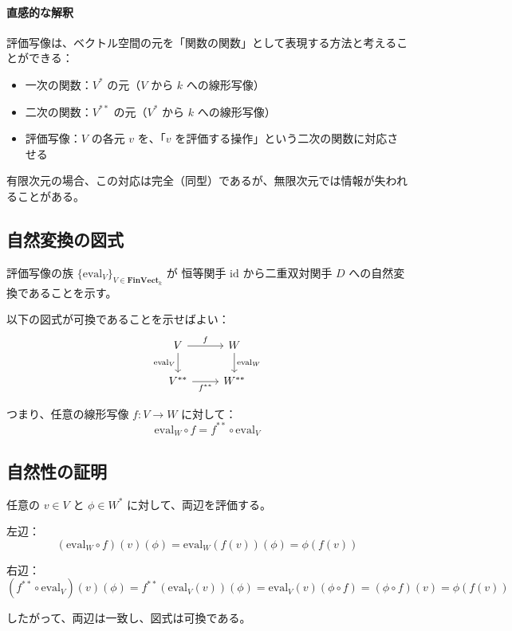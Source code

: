 \documentclass[uplatex,a4j,12pt,dvipdfmx]{jsarticle}
\begin{document}
\paragraph{直感的な解釈}

評価写像は、ベクトル空間の元を「関数の関数」として表現する方法と考えることができる：
\begin{itemize}
	\item 一次の関数：$V^*$ の元（$V$ から $k$ への線形写像）
	\item 二次の関数：$V^{**}$ の元（$V^*$ から $k$ への線形写像）
	\item 評価写像：$V$ の各元 $v$ を、「$v$ を評価する操作」という二次の関数に対応させる
\end{itemize}

有限次元の場合、この対応は完全（同型）であるが、無限次元では情報が失われることがある。





\subsection{自然変換の図式}

評価写像の族 $\{\mathrm{eval}_V\}_{V \in \mathbf{FinVect}_k}$ が
恒等関手 $\mathrm{id}$ から二重双対関手 $D$ への自然変換であることを示す。

以下の図式が可換であることを示せばよい：
\[
	\begin{tikzcd}
		V \arrow[r, "f"] \arrow[d, "\mathrm{eval}_V"']
		& W \arrow[d, "\mathrm{eval}_W"] \\
		V^{**} \arrow[r, "f^{**}"']
		& W^{**}
	\end{tikzcd}
\]

つまり、任意の線形写像 $f: V \to W$ に対して：
\[
	\mathrm{eval}_W \circ f = f^{**} \circ \mathrm{eval}_V
\]

\subsection{自然性の証明}

任意の $v \in V$ と $\phi \in W^*$ に対して、両辺を評価する。

左辺：
\[
	(\mathrm{eval}_W \circ f)(v)(\phi) = \mathrm{eval}_W(f(v))(\phi) = \phi(f(v))
\]

右辺：
\[
	(f^{**} \circ \mathrm{eval}_V)(v)(\phi) = f^{**}(\mathrm{eval}_V(v))(\phi)
	= \mathrm{eval}_V(v)(\phi \circ f) = (\phi \circ f)(v) = \phi(f(v))
\]

したがって、両辺は一致し、図式は可換である。
\end{document}
